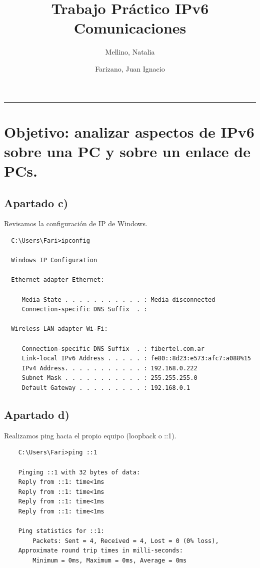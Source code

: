 \documentclass[11pt]{article}
\title{
    Trabajo Práctico IPv6 \\
    \large Comunicaciones}
\author{Mellino, Natalia \and Farizano, Juan Ignacio}
\date{}
\begin{document}
\maketitle
\noindent\rule{\textwidth}{1pt}


\section{Objetivo: analizar aspectos de IPv6 sobre una PC y sobre un enlace de PCs.}

\subsection*{Apartado c)}

Revisamos la configuración de IP de Windows.

\begin{verbatim}
  C:\Users\Fari>ipconfig

  Windows IP Configuration
  
  Ethernet adapter Ethernet:
  
     Media State . . . . . . . . . . . : Media disconnected
     Connection-specific DNS Suffix  . :
  
  Wireless LAN adapter Wi-Fi:
  
     Connection-specific DNS Suffix  . : fibertel.com.ar
     Link-local IPv6 Address . . . . . : fe80::8d23:e573:afc7:a088%15
     IPv4 Address. . . . . . . . . . . : 192.168.0.222
     Subnet Mask . . . . . . . . . . . : 255.255.255.0
     Default Gateway . . . . . . . . . : 192.168.0.1  
\end{verbatim}

\subsection*{Apartado d)}

Realizamos ping hacia el propio equipo (loopback o ::1).

\begin{verbatim}
    C:\Users\Fari>ping ::1

    Pinging ::1 with 32 bytes of data:
    Reply from ::1: time<1ms
    Reply from ::1: time<1ms
    Reply from ::1: time<1ms
    Reply from ::1: time<1ms

    Ping statistics for ::1:
        Packets: Sent = 4, Received = 4, Lost = 0 (0% loss),
    Approximate round trip times in milli-seconds:
        Minimum = 0ms, Maximum = 0ms, Average = 0ms
\end{verbatim}
\end{document}
